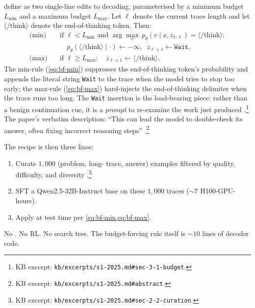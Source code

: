 \citet[\S 3.1]{s1-2025} define  as two single-line
edits to  decoding, parameterised by a minimum budget
$L_\text{min}$ and a maximum budget $L_\text{max}$. Let
$\ell$ denote the current trace length and let $\langle/\text{think}\rangle$
denote the end-of-thinking token. Then:
\begin{align}
  \text{(min)} \quad &\text{if } \ell < L_\text{min} \text{ and } \arg\max_v\, p_\theta(v \mid x, z_{1:\ell}) = \langle/\text{think}\rangle:\nonumber \\
  &\quad p_\theta(\langle/\text{think}\rangle \mid \cdot) \leftarrow -\infty,\;\; z_{\ell+1} \leftarrow \texttt{Wait}, \label{eq:bf-min} \\
  \text{(max)} \quad &\text{if } \ell \ge L_\text{max}:\quad z_{\ell+1} \leftarrow \langle/\text{think}\rangle. \label{eq:bf-max}
\end{align}
The min-rule (\cref{eq:bf-min}) suppresses the end-of-thinking token's
probability and appends the literal string \texttt{Wait} to the trace
when the model tries to stop too early; the max-rule
(\cref{eq:bf-max}) hard-injects the end-of-thinking delimiter when the
trace runs too long. The \texttt{Wait} insertion is the load-bearing
piece: rather than a benign continuation cue, it is a \emph{prompt} to
re-examine the work just produced
\citep[\S 3.1]{s1-2025}.\footnote{KB excerpt:
\texttt{kb/excerpts/s1-2025.md\#sec-3-1-budget}.} The paper's verbatim
description: ``This can lead the model to double-check its answer,
often fixing incorrect reasoning steps''
\citep[abstract]{s1-2025}.\footnote{KB excerpt:
\texttt{kb/excerpts/s1-2025.md\#abstract}.}

The recipe is then three lines:
\begin{enumerate}
  \item Curate $1{,}000$ (problem, long- trace, answer) examples
        filtered by quality, difficulty, and diversity
        \citep[\S 2.2]{s1-2025}.\footnote{KB excerpt:
        \texttt{kb/excerpts/s1-2025.md\#sec-2-2-curation}.}
  \item SFT a Qwen2.5-32B-Instruct base on these $1{,}000$ traces
        ($\sim 7$ H100-GPU-hours).
  \item Apply  at test time per
        \cref{eq:bf-min,eq:bf-max}.
\end{enumerate}
No . No RL. No search tree. The budget-forcing rule itself
is $\sim 10$ lines of decoder code.

